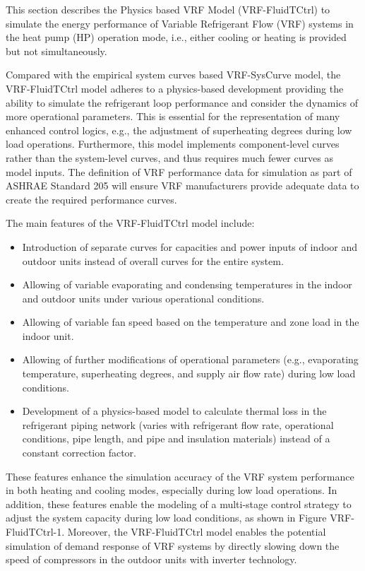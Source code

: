 This section describes the Physics based VRF Model (VRF-FluidTCtrl) to simulate the energy performance of Variable Refrigerant Flow (VRF) systems in the heat pump (HP) operation mode, i.e., either cooling or heating is provided but not simultaneously. 

Compared with the empirical system curves based VRF-SysCurve model, the VRF-FluidTCtrl model adheres to a physics-based development providing the ability to simulate the refrigerant loop performance and consider the dynamics of more operational parameters. This is essential for the representation of many enhanced control logics, e.g., the adjustment of superheating degrees during low load operations. Furthermore, this model implements component-level curves rather than the system-level curves, and thus requires much fewer curves as model inputs. The definition of VRF performance data for simulation as part of ASHRAE Standard 205 will ensure VRF manufacturers provide adequate data to create the required performance curves. 

The main features of the VRF-FluidTCtrl model include:

\begin{itemize}
  \item
   Introduction of separate curves for capacities and power inputs of indoor and outdoor units instead of overall curves for the entire system.
 \item
   Allowing of variable evaporating and condensing temperatures in the indoor and outdoor units under various operational conditions.
\item
  Allowing of variable fan speed based on the temperature and zone load in the indoor unit.
\item
  Allowing of further modifications of operational parameters (e.g., evaporating temperature, superheating degrees, and supply air flow rate) during low load conditions.
\item
  Development of a physics-based model to calculate thermal loss in the refrigerant piping network (varies with refrigerant flow rate, operational conditions, pipe length, and pipe and insulation materials) instead of a constant correction factor.
\end{itemize}

These features enhance the simulation accuracy of the VRF system performance in both heating and cooling modes, especially during low load operations. In addition, these features enable the modeling of a multi-stage control strategy to adjust the system capacity during low load conditions, as shown in Figure VRF-FluidTCtrl-1. Moreover, the VRF-FluidTCtrl model enables the potential simulation of demand response of VRF systems by directly slowing down the speed of compressors in the outdoor units with inverter technology.

